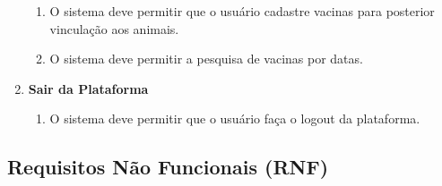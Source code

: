 \documentclass[12pt, a4paper]{article}
\begin{document}
\begin{spacing}{1.5}
\begin{enumerate}[label=RF0\arabic{*}.]
\begin{enumerate}[label=RF9.0\arabic{*}]
        \item O sistema deve permitir que o usuário cadastre vacinas para posterior vinculação aos animais.
        \item O sistema deve permitir a pesquisa de vacinas por datas.
    \end{enumerate}
    \item \textbf{Sair da Plataforma}
    \begin{enumerate}[label=RF10.0\arabic{*}]
        \item O sistema deve permitir que o usuário faça o logout da plataforma.
    \end{enumerate}
\end{enumerate}
\end{spacing}

\subsection{Requisitos Não Funcionais (RNF)}
\end{document}
